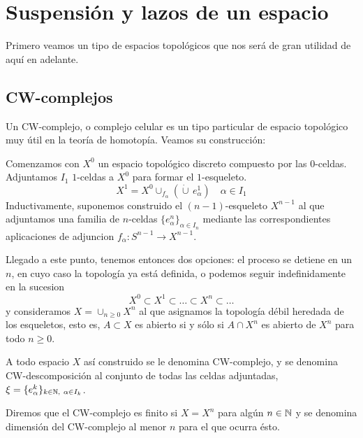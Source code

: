 \chapter{Suspensión y lazos de un espacio}
Primero veamos un tipo de espacios topológicos que nos será de gran utilidad de aquí en adelante.
\section{CW-complejos}
Un CW-complejo, o complejo celular es un tipo particular de espacio topológico muy útil en la teoría de homotopía. Veamos su construcción: \par
Comenzamos con $X^0$ un espacio topológico discreto compuesto por las $0$-celdas. Adjuntamos $I_1$ $1$-celdas a $X^0$ para formar el $1$-esqueleto.
\[ X^1 = X^0 \cup_{f_\alpha} \left( \dot{\cup} \, e_\alpha^1 \right) \quad \alpha \in I_1\]
Inductivamente, suponemos construido el $(n-1)$-esqueleto $X^{n-1}$ al que adjuntamos una familia de $n$-celdas $\{e_\alpha^n\}_{\alpha \in I_n}$ mediante las correspondientes aplicaciones de adjuncion $f_\alpha : S^{n-1} \longrightarrow X^{n-1}$. \par 
Llegado a este punto, tenemos entonces dos opciones: el proceso se detiene en un $n$, en cuyo caso la topología ya está definida, o podemos seguir indefinidamente en la sucesion
\[ X^0 \subset X^1 \subset \ldots \subset X^n \subset \ldots \]
y consideramos $\displaystyle X = \cup_{n \geq 0} X^n $ al que asignamos la topología débil heredada de los esqueletos, esto es, $A \subset X$ es abierto si y sólo si $A \cap X^n$ es abierto de $X^n$ para todo $n \geq 0$. \par 
A todo espacio $X$ así construido se le denomina CW-complejo, y se denomina CW-descomposición al conjunto de todas las celdas adjuntadas, $\xi = \{e^k_\alpha\}_{k \in \mathbb{N}, \ \alpha \in I_k}$. \par
Diremos que el CW-complejo es finito si $X = X^n$ para algún $n \in \mathbb{N}$ y se denomina dimensión del CW-complejo al menor $n$ para el que ocurra ésto.

